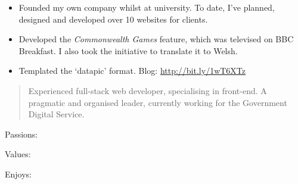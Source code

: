 \documentclass[10pt,a4paper,ragged2e,withhyper]{altacv}
\begin{document}
\begin{paracol}{2}
\begin{itemize}
    \item Founded my own company whilst at university. To date, I've planned, designed and developed over 10 websites for clients.
\end{itemize}

\divider


\begin{itemize}
    \item Developed the \emph{Commonwealth Games} feature, which was televised on BBC Breakfast. I also took the initiative to translate it to Welsh.
    \item Templated the ‘datapic’ format. Blog: \url{http://bit.ly/1wT6XTz}
\end{itemize}


\nocite{*}

\printbibliography[heading=pubtype,title={\printinfo{\faUsers}{Talks}},type=inproceedings]


\printbibliography[heading=pubtype,title={\printinfo{\faBook}{Books}},type=book]


\printbibliography[heading=pubtype,title={\printinfo{\faFile*[regular]}{Articles}}, type=misc]


\switchcolumn

\begin{quote}
Experienced full-stack web developer, specialising in front-end. A pragmatic and organised leader, currently working for the Government Digital Service.
\end{quote}

\bigskip

Passions:

\medskip

Values:
\hspace{2mm} %


Enjoys:
\hspace{2mm} %


\end{paracol}
\end{document}
